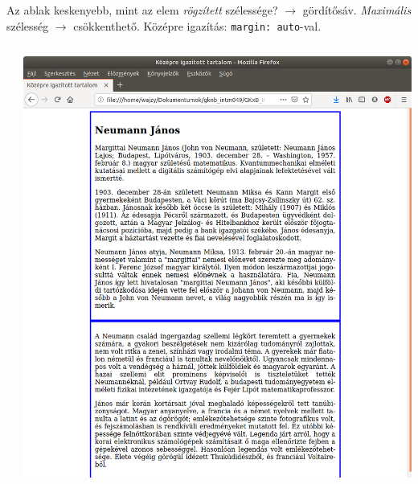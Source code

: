 \begin{frame}
  Az ablak keskenyebb, mint az elem \emph{rögzített} szélessége? $\to$ gördítősáv. \emph{Maximális} szélesség $\to$ csökkenthető. Középre igazítás: \texttt{margin: auto}-val.
  \begin{columns}[c]
      \begin{exampleblock}{}
        \fontsize{7}{8} \selectfont
        
        
        
      \end{exampleblock}
      \includegraphics[width=\textwidth]{kozepre1.png}

\end{columns}
\end{frame}
